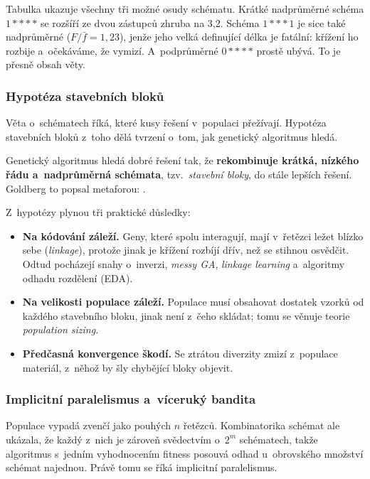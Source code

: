 \documentclass[11pt,a4paper]{article}
\theoremstyle{definition}
\begin{document}
Tabulka ukazuje všechny tři možné osudy schématu. Krátké nadprůměrné schéma
$1{*}{*}{*}{*}$ se rozšíří ze dvou zástupců zhruba na 3,2. Schéma $1{*}{*}{*}1$ je
sice také nadprůměrné ($F/\bar f = 1{,}23$), jenže jeho velká definující délka je
fatální: křížení ho rozbije a~očekáváme, že vymizí. A~podprůměrné $0{*}{*}{*}{*}$
prostě ubývá. To je přesně obsah věty.

\subsubsection{Hypotéza stavebních bloků}

Věta o~schématech říká, které kusy řešení v~populaci přežívají. Hypotéza stavebních
bloků z~toho dělá tvrzení o~tom, jak genetický algoritmus hledá.

\begin{defbox}
Genetický algoritmus hledá dobré řešení tak, že \textbf{rekombinuje krátká,
nízkého řádu a~nadprůměrná schémata}, tzv.\ \emph{stavební bloky},
do stále lepších řešení.
Goldberg to popsal metaforou: .
\end{defbox}

Z~hypotézy plynou tři praktické důsledky:
\begin{itemize}
\item \textbf{Na kódování záleží.} Geny, které spolu interagují, mají v~řetězci ležet
  blízko sebe (\emph{linkage}), protože jinak je křížení rozbíjí dřív, než se stihnou
  osvědčit. Odtud pocházejí snahy o~inverzi, \emph{messy GA}, \emph{linkage learning}
  a~algoritmy odhadu rozdělení (EDA).
\item \textbf{Na velikosti populace záleží.} Populace musí obsahovat dostatek vzorků
  od každého stavebního bloku, jinak není z~čeho skládat; tomu se věnuje teorie
  \emph{population sizing}.
\item \textbf{Předčasná konvergence škodí.} Se ztrátou diverzity zmizí z~populace
  materiál, z~něhož by šly chybějící bloky objevit.
\end{itemize}

\subsubsection{Implicitní paralelismus a~víceruký bandita}

Populace vypadá zvenčí jako pouhých $n$ řetězců. Kombinatorika schémat ale ukázala, že
každý z~nich je zároveň svědectvím o~$2^m$ schématech, takže algoritmus s~jedním
vyhodnocením fitness posouvá odhad u~obrovského množství schémat najednou. Právě tomu se
říká implicitní paralelismus.
\end{document}
